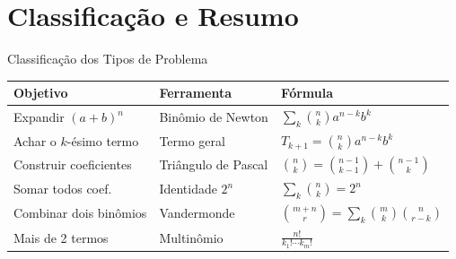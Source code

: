 \documentclass[9pt]{beamer}
\begin{document}
\section{Classificação e Resumo}

\begin{frame}{Classificação dos Tipos de Problema}

\begin{center}
\begin{tabular}{|l|l|l|}
\hline
\textbf{Objetivo} & \textbf{Ferramenta} & \textbf{Fórmula} \\
\hline
Expandir $(a+b)^n$     & Binômio de Newton & $\sum_{k}\binom{n}{k}a^{n-k}b^k$ \\
\hline
Achar o $k$-ésimo termo & Termo geral & $T_{k+1}=\binom{n}{k}a^{n-k}b^k$ \\
\hline
Construir coeficientes & Triângulo de Pascal & $\binom{n}{k}=\binom{n-1}{k-1}+\binom{n-1}{k}$ \\
\hline
Somar todos coef.      & Identidade $2^n$ & $\sum_{k}\binom{n}{k}=2^n$ \\
\hline
Combinar dois binômios & Vandermonde & $\binom{m+n}{r}=\sum_k\binom{m}{k}\binom{n}{r-k}$ \\
\hline
Mais de 2 termos       & Multinômio & $\frac{n!}{k_1!\cdots k_m!}$ \\
\hline
\end{tabular}
\end{center}
\end{frame}
\end{document}
